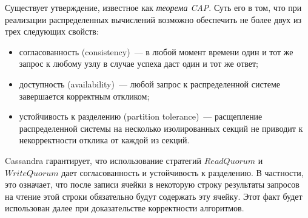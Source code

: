 Существует утверждение, известное как \textit{теорема CAP}. Суть его в том, что при реализации распределенных вычислений возможно обеспечить не более двух из трех следующих свойств:

\begin{itemize}
	\item согласованность (consistency)~--- в любой момент времени один и тот же запрос к любому узлу в случае успеха даст один и тот же ответ;
	\item доступность (availability)~--- любой запрос к распределенной системе завершается корректным откликом;
	\item устойчивость к разделению (partition tolerance)~--- расщепление распределенной системы на несколько изолированных секций не приводит к некорректности отклика от каждой из секций.
\end{itemize}

Cassandra гарантирует, что использование стратегий $ReadQuorum$ и \\$WriteQuorum$ дает согласованность и устойчивость к разделению. В частности, это означает, что после записи ячейки в некоторую строку результаты запросов на чтение этой строки обязательно будут содержать эту ячейку. Этот факт будет использован далее при доказательстве корректности алгоритмов.